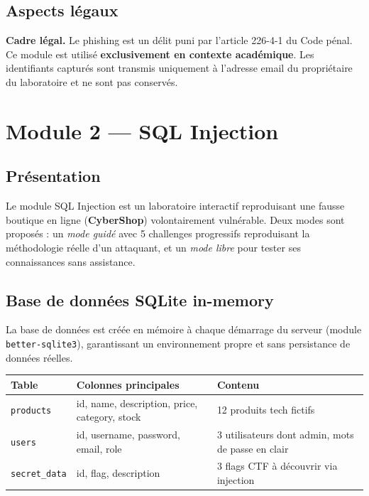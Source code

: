 \documentclass[12pt,a4paper]{report}
\newcommand{\code}[1]{\texttt{#1}}
\begin{document}
\section{Aspects légaux}

\begin{warnbox}
  \textbf{Cadre légal.}
  Le phishing est un délit puni par l'article 226-4-1 du Code pénal.
  Ce module est utilisé \textbf{exclusivement en contexte académique}.
  Les identifiants capturés sont transmis uniquement à l'adresse email
  du propriétaire du laboratoire et ne sont pas conservés.
\end{warnbox}

\chapter{Module 2 — SQL Injection}

\section{Présentation}

Le module SQL Injection est un laboratoire interactif reproduisant une
fausse boutique en ligne (\textbf{CyberShop}) volontairement vulnérable.
Deux modes sont proposés : un \textit{mode guidé} avec 5 challenges
progressifs reproduisant la méthodologie réelle d'un attaquant, et un
\textit{mode libre} pour tester ses connaissances sans assistance.

\section{Base de données SQLite in-memory}

La base de données est créée en mémoire à chaque démarrage du serveur
(module \code{better-sqlite3}), garantissant un environnement propre
et sans persistance de données réelles.

\begin{center}
\begin{tabular}{L{3cm} L{4cm} L{6.5cm}}
  \toprule
  \textbf{Table} & \textbf{Colonnes principales} & \textbf{Contenu} \\
  \midrule
  \code{products}
    & id, name, description, price, category, stock
    & 12 produits tech fictifs \\[4pt]
  \code{users}
    & id, username, password, email, role
    & 3 utilisateurs dont admin, mots de passe en clair \\[4pt]
  \code{secret\_data}
    & id, flag, description
    & 3 flags CTF à découvrir via injection \\
  \bottomrule
\end{tabular}
\end{center}
\end{document}
